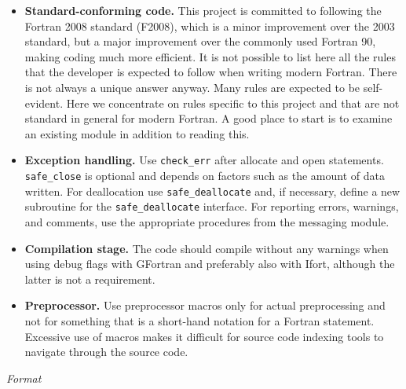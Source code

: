 \documentclass{article}
\begin{document}
\begin{itemize}
\item \textbf{Standard-conforming code.} This project is committed to following the Fortran 2008 standard (F2008), which is a minor improvement over the 2003 standard, but a major improvement over the commonly used Fortran 90, making coding much more efficient. It is not possible to list here all the rules that the developer is expected to follow when writing modern Fortran. There is not always a unique answer anyway. Many rules are expected to be self-evident. Here we concentrate on rules specific to this project and that are not standard in general for modern Fortran. A good place to start is to examine an existing module in addition to reading this.
\item \textbf{Exception handling.} Use \verb+check_err+ after allocate and open statements. \verb+safe_close+ is optional and depends on factors such as the amount of data written. For deallocation use \verb+safe_deallocate+ and, if necessary, define a new subroutine for the \verb+safe_deallocate+ interface. For reporting errors, warnings, and comments, use the appropriate procedures from the messaging module.
\item \textbf{Compilation stage.} The code should compile without any warnings when using debug flags with GFortran and preferably also with Ifort, although the latter is not a requirement.
\item \textbf{Preprocessor.} Use preprocessor macros only for actual preprocessing and not for something that is a short-hand notation for a Fortran statement. Excessive use of macros makes it difficult for source code indexing tools to navigate through the source code.
\end{itemize}

\noindent\textit{Format}
\end{document}
